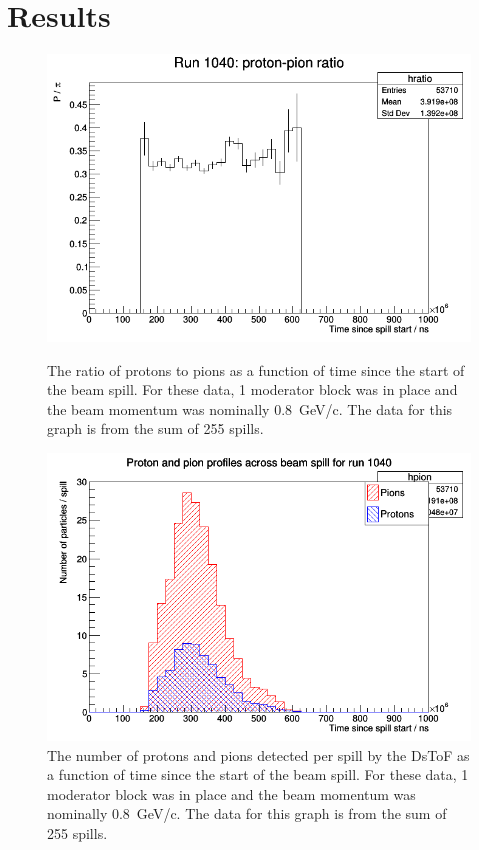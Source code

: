 \section{Results}
\label{hptpcPaper:sec:Results}

	\begin{figure}[ht]
		\begin{minipage}[t]{0.48\textwidth}
			\centering
			\includegraphics[width=\textwidth]{files/Figures/Run1040_proPiRatio}
			\caption{The ratio of protons to pions as a function of time since the start of the beam spill. For these data, 1 moderator block was in place and the beam momentum was nominally 0.8~GeV/c. The data for this graph is from the sum of 255 spills.}
			\label{fig:proPiRatio}
		\end{minipage} 
		\hspace{0.3cm}
		\begin{minipage}[t]{0.48\textwidth}
			\centering
			\includegraphics[width=\textwidth]{files/Figures/Run1040_proPiProf}
			\caption{The number of protons and pions detected per spill by the DsToF as a function of time since the start of the beam spill. For these data, 1 moderator block was in place and the beam momentum was nominally 0.8~GeV/c. The data for this graph is from the sum of 255 spills.}
			\label{fig:proPiProf}
		\end{minipage}
	\end{figure}
   
